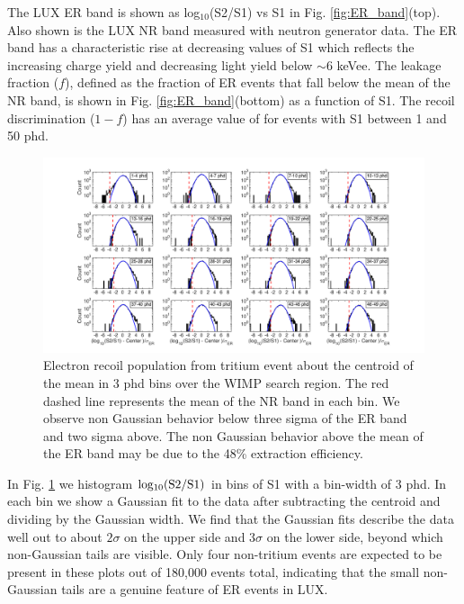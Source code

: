 The LUX ER band is shown as log$_{10}$(S2/S1) vs S1 in Fig. \ref{fig:ER_band}(top).  Also shown is the LUX NR band measured with neutron generator data\cite{DD-paper,lux-reanalysis}. The ER band has a characteristic rise at decreasing values of S1 which reflects the increasing charge yield and decreasing light yield below $\sim$6 keVee. The leakage fraction ($f$), defined as the fraction of ER events that fall below the mean of the NR band, is shown in Fig. \ref{fig:ER_band}(bottom) as a function of S1. The recoil discrimination ($1-f$) has an average value of  for events with S1 between 1 and 50 phd.


\onecolumngrid
\break
\begin{figure}\centering
\includegraphics[width=220mm]{fig/Gaussianity/GaussER_all.png}
\caption{Electron recoil population from tritium event about the centroid of the mean in 3 phd bins over the WIMP search region. The red dashed line represents the mean of the NR band in each bin. We observe non Gaussian behavior below three sigma of the ER band and two sigma above. The non Gaussian behavior above the mean of the ER band may be due to the 48\% extraction efficiency.  }
\label{fig:ER-Gauss}
\end{figure}
\twocolumngrid

In Fig. \ref{fig:ER-Gauss} we histogram $\rm log_{10}(S2/S1)$ in bins of S1 with a bin-width of 3 phd. In each bin we show a Gaussian fit to the data after subtracting the centroid and dividing by the Gaussian width. We find that the Gaussian fits describe the data well out to about $2\sigma$ on the upper side and $3\sigma$ on the lower side, beyond which non-Gaussian tails are visible. Only four non-tritium events are expected to be present in these plots out of 180,000 events total, indicating that the small non-Gaussian tails are a genuine feature of ER events in LUX.

